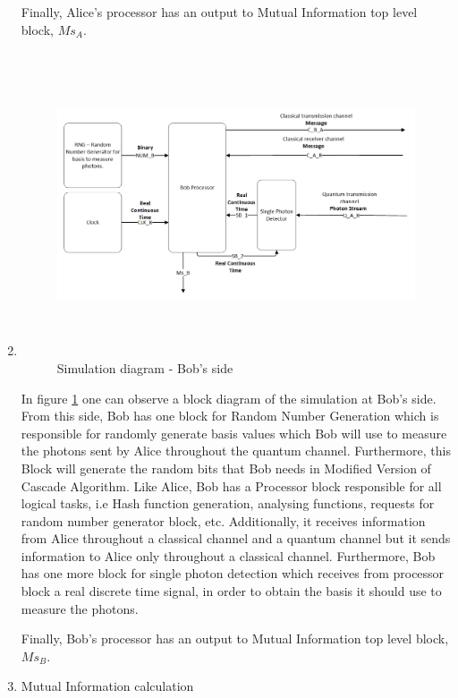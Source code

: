 \begin{enumerate}
    Finally, Alice's processor has an output to Mutual Information top level block, $Ms_{A}$.


  \item

  \begin{figure}[h]
	\centering
	\includegraphics[width=1.1\textwidth, height=9cm]{./sdf/ot_with_discrete_variables/figures/Simulation_Bob.png}
	\caption{Simulation diagram - Bob's side}\label{simulationbob}
\end{figure}

    In figure \ref{simulationbob} one can observe a block diagram of the simulation at Bob's side. From this side, Bob has one block for Random Number Generation which is responsible for randomly generate basis values which Bob will use to measure the photons sent by Alice throughout the quantum channel. Furthermore, this Block will generate the random bits that Bob needs in Modified Version of Cascade Algorithm. Like Alice, Bob has a Processor block responsible for all logical tasks, i.e Hash function generation, analysing functions, requests for random number generator block, etc. Additionally, it receives information from Alice throughout a classical channel and a quantum channel but it sends information to Alice only throughout a classical channel. Furthermore, Bob has one more block for single photon detection which receives from processor block a real discrete time signal, in order to obtain the basis it should use to measure the photons.

    Finally, Bob's processor has an output to Mutual Information top level block, $Ms_{B}$.

  \item Mutual Information calculation

\end{enumerate}


